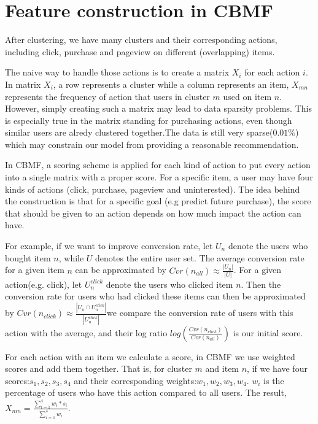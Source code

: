 \section{Feature construction in CBMF}

After clustering, we have many clusters and their corresponding actions, including click, purchase and pageview on different (overlapping) items.

The naive way to handle those actions is to create a matrix $X_i$ for each action $i$. In matrix $X_i$, a row represents a cluster while a column represents an item, $X_{mn}$ represents the frequency of action that users in cluster $m$ used on item $n$. However, simply creating such a matrix may lead to data sparsity problems. This is especially true in the matrix standing for purchasing actions, even though similar users are alredy clustered together.The data is still very sparse($0.01\%$) which may constrain our model from providing a reasonable recommendation.

In CBMF, a scoring scheme is applied for each kind of action to put every action into a single matrix with a proper score. For a specific item, a user may have four kinds of actions (click, purchase, pageview and uninterested). The idea behind the construction is that for a specific goal (e.g predict future purchase), the score that should be given to an action depends on how much impact the action can have.

For example, if we want to improve conversion rate, let $U_n$ denote the users who bought item $n$, while $U$ denotes the entire user set. The average conversion rate for a given item $n$ can be approximated by $Cvr(n_{all}) \approx \frac{|U_n|}{|U|}$. 
For a given action(e.g. click), let $U_n^{click}$ denote the users who clicked item $n$. Then the conversion rate for users who had clicked these items can then be approximated by $Cvr(n_{click}) \approx \frac{|U_n \cap U_n^{click}|}{|U_n^{click}|}$we compare the conversion rate of users with this action with the average, and their log ratio $log(\frac{Cvr(n_{click})}{Cvr(n_{all})})$ is our initial score.

For each action with an item we calculate a score, in CBMF we use weighted scores and add them together. That is, for cluster $m$ and item $n$, if we have four scores:$s_1, s_2, s_3, s_4$ and their corresponding weights:$w_1, w_2, w_3, w_4$. $w_i$ is the percentage of users who have this action compared to all users. The result, $X_{mn} = \frac{\sum_{i=1}^4 w_i*s_i}{\sum_{i=1}^4 w_i}$. 

